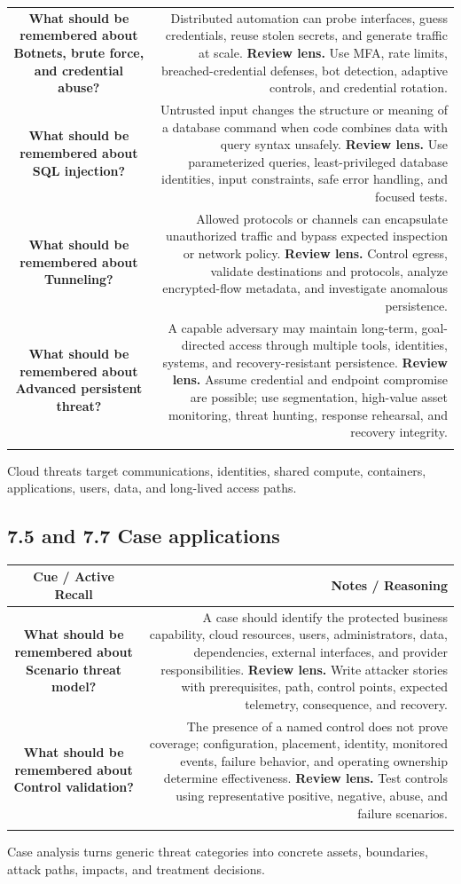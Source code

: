 \documentclass[11pt]{article}
\newcommand{\CornellHeader}{\rowcolor{Navy}\color{white}\bfseries Cue / Active Recall & \color{white}\bfseries Notes / Reasoning \\\endhead}
\newcommand{\CornellRow}[2]{\cellcolor{CueGray}\textbf{#1} & #2 \\\addlinespace[3pt]}
\begin{document}
\begin{longtable}{@{}C N@{}}
\CornellRow{What should be remembered about Botnets, brute force, and credential abuse?}{Distributed automation can probe interfaces, guess credentials, reuse stolen secrets, and generate traffic at scale. \textbf{Review lens.} Use MFA, rate limits, breached-credential defenses, bot detection, adaptive controls, and credential rotation.}
\CornellRow{What should be remembered about SQL injection?}{Untrusted input changes the structure or meaning of a database command when code combines data with query syntax unsafely. \textbf{Review lens.} Use parameterized queries, least-privileged database identities, input constraints, safe error handling, and focused tests.}
\CornellRow{What should be remembered about Tunneling?}{Allowed protocols or channels can encapsulate unauthorized traffic and bypass expected inspection or network policy. \textbf{Review lens.} Control egress, validate destinations and protocols, analyze encrypted-flow metadata, and investigate anomalous persistence.}
\CornellRow{What should be remembered about Advanced persistent threat?}{A capable adversary may maintain long-term, goal-directed access through multiple tools, identities, systems, and recovery-resistant persistence. \textbf{Review lens.} Assume credential and endpoint compromise are possible; use segmentation, high-value asset monitoring, threat hunting, response rehearsal, and recovery integrity.}
\end{longtable}
\begin{sectionsummarybox}
Cloud threats target communications, identities, shared compute, containers, applications, users, data, and long-lived access paths.
\end{sectionsummarybox}
\subsection{7.5 and 7.7 Case applications}
\begin{longtable}{@{}C N@{}}
\CornellHeader
\CornellRow{What should be remembered about Scenario threat model?}{A case should identify the protected business capability, cloud resources, users, administrators, data, dependencies, external interfaces, and provider responsibilities. \textbf{Review lens.} Write attacker stories with prerequisites, path, control points, expected telemetry, consequence, and recovery.}
\CornellRow{What should be remembered about Control validation?}{The presence of a named control does not prove coverage; configuration, placement, identity, monitored events, failure behavior, and operating ownership determine effectiveness. \textbf{Review lens.} Test controls using representative positive, negative, abuse, and failure scenarios.}
\end{longtable}
\begin{sectionsummarybox}
Case analysis turns generic threat categories into concrete assets, boundaries, attack paths, impacts, and treatment decisions.
\end{sectionsummarybox}
\end{document}
